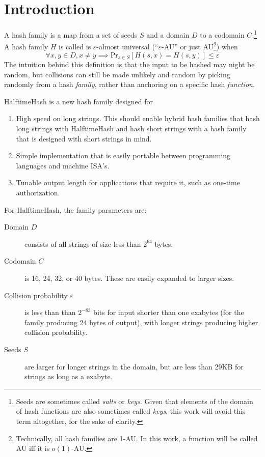 \documentclass[sigconf, nonacm]{acmart}
\begin{document}
\section{Introduction}
A hash family is a map from a set of seeds $S$ and a domain $D$ to a codomain $C$.\footnote{Seeds are sometimes called {\em salts} or {\em keys}. Given that elements of the domain of hash functions are also sometimes called {\em keys}, this work will avoid this term altogether, for the sake of clarity.}
A hash family $H$ is called is $\varepsilon$-almost universal (``$\varepsilon$-AU'' or just AU\footnote{Technically, all hash families are 1-AU. In this work, a function will be called AU iff it is $o(1)$-AU.}) when
\[\forall x,y \in D, x \neq y \implies \mathrm{Pr}_{s \in S}[H(s, x) = H(s, y)] \leq \varepsilon\]
The intuition behind this definition is that the input to be hashed may night be random, but collisions can still be made unlikely and random by picking randomly from a hash {\em family}, rather than anchoring on a specific hash {\em function}.

HalftimeHash is a new hash family designed for

\begin{enumerate}
\item High speed on long strings.
  This should enable hybrid hash families that hash long strings with HalftimeHash and hash short strings with a hash family that is designed with short strings in mind. \cite{siphash,umash}
\item Simple implementation that is easily portable between programming languages and machine ISA's.
\item Tunable output length for applications that require it, such as one-time authorization. \cite{nacl} 
\end{enumerate}

For HalftimeHash, the family parameters are:

\begin{description}
\item[Domain $D$] consists of all strings of size less than $2^{64}$ bytes.
\item[Codomain $C$] is 16, 24, 32, or 40 bytes.
  These are easily expanded to larger sizes.
\item[Collision probability $\varepsilon$] is less than than $2^{-83}$ bits for input shorter than one exabytes (for the family producing 24 bytes of output), with longer strings producing higher collision probability.
\item[Seeds $S$] are larger for longer strings in the domain, but are less than 29KB for strings as long as a exabyte.
\end{description}
\end{document}
